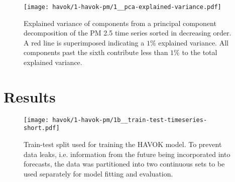 \begin{figure}[h]
  \centering
  \texttt{[image: havok/1-havok-pm/1\_\_pca-explained-variance.pdf]}
  \caption{Explained variance of components from a principal component
    decomposition of the PM 2.5 time series sorted in decreasing order. A red
    line is superimposed indicating a $1\%$ explained variance. All components
    past the sixth contribute less than $1\%$ to the total explained variance. }
  \label{fig:pm-timeseries-pca}
\end{figure}


\section{Results}


\begin{figure}[h]
  \centering
  \texttt{[image: havok/1-havok-pm/1b\_\_train-test-timeseries-short.pdf]}
  \caption{Train-test split used for training the HAVOK model. To prevent data
    leaks, i.e. information from the future being incorporated into forecasts,
    the data was partitioned into two continuous sets to be used separately for
    model fitting and evaluation.}
  \label{fig:pm-train-test-split}
\end{figure}



